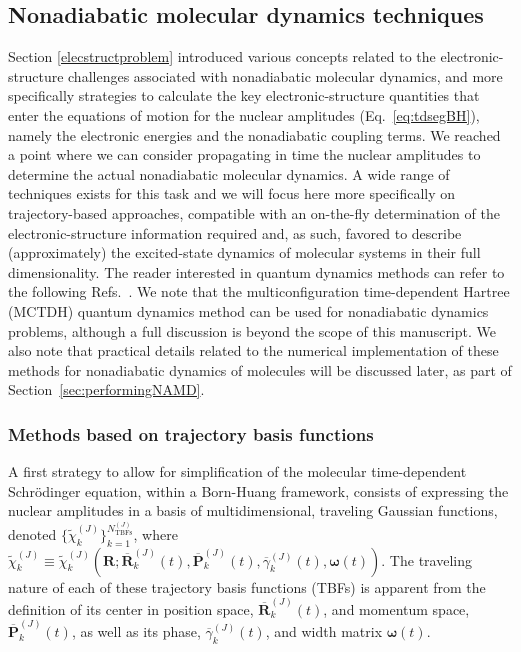 \documentclass[9pt,bestpractices,pubversion]{livecoms}
\newcommand{\bs}{\mathbf}
\begin{document}
\subsection{Nonadiabatic molecular dynamics techniques}
\label{nonadiabaticdynproblem}

Section \ref{elecstructproblem} introduced various concepts related to the electronic-structure challenges associated with nonadiabatic molecular dynamics, and more specifically strategies to calculate the key electronic-structure quantities that enter the equations of motion for the nuclear amplitudes (Eq.~\eqref{eq:tdsegBH}), namely the electronic energies and the nonadiabatic coupling terms. We reached a point where we can consider propagating in time the nuclear amplitudes to determine the actual nonadiabatic molecular dynamics. A wide range of techniques exists for this task and we will focus here more specifically on trajectory-based approaches, compatible with an on-the-fly determination of the electronic-structure information required and, as such, favored to describe (approximately) the excited-state dynamics of molecular systems in their full dimensionality. The reader interested in quantum dynamics methods can refer to the following Refs.~. We note that the multiconfiguration time-dependent Hartree (MCTDH) quantum dynamics method can be used for nonadiabatic dynamics problems, although a full discussion is beyond the scope of this manuscript. We also note that practical details related to the numerical implementation of these methods for nonadiabatic dynamics of molecules will be discussed later, as part of Section~\ref{sec:performingNAMD}.

\subsubsection{Methods based on trajectory basis functions}
\label{sec:gaussmethod}
A first strategy to allow for simplification of the molecular time-dependent Schr\"{o}dinger equation, within a Born-Huang framework, consists of expressing the nuclear amplitudes in a basis of multidimensional, traveling Gaussian functions, denoted $\{\tilde{\chi}_k^{(J)}\}_{k=1}^{N_{\text{TBFs}}^{(J)}}$, where $\tilde{\chi}_k^{(J)} \equiv \tilde{\chi}_k^{(J)}\left(\bs R;\overline{\bs R}_k^{(J)}(t),\overline{\bs P}_k^{(J)}(t),\overline{\gamma}_k^{(J)}(t),\boldsymbol{\omega}(t)\right)$. The traveling nature of each of these trajectory basis functions (TBFs) is apparent from the definition of its center in position space, $\overline{\bs R}_k^{(J)}(t)$, and momentum space, $\overline{\bs P}_k^{(J)}(t)$, as well as its phase, $\overline{\gamma}_k^{(J)}(t)$, and width matrix $\boldsymbol{\omega}(t)$.
\end{document}
